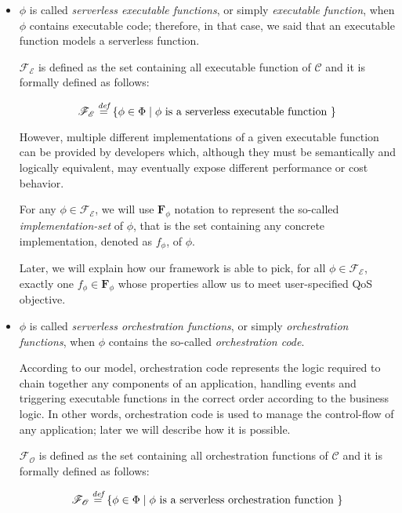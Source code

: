 \begin{itemize}
	
	\item $\phi$ is called \textit{serverless executable functions}, or simply \textit{executable function}, when $\phi$ contains executable code; therefore, in that case, we said that an executable function models a serverless function.
	
	$\mathscr{F_E}$ is defined as the set containing all executable function of $\mathcal{C}$ and it is formally defined as follows:
	
	\begin{equation}
		\mathscr{F_E} \overset{\textit{def}}{=} \left\lbrace \phi \in \Phi \mid \phi \text{ is a serverless executable function }\right\rbrace 
	\end{equation}
	
	However, multiple different implementations of a given executable function can be provided by developers which, although they must be semantically and logically equivalent, may eventually expose different performance or cost behavior. 
	
	For any $\phi \in \mathscr{F_E}$, we will use $\textbf{F}_{\phi}$ notation to represent the so-called \textit{implementation-set} of $\phi$, that is the set containing any concrete implementation, denoted as $f_{\phi}$, of $\phi$.
	
	Later, we will explain how our framework is able to pick, for all $\phi \in \mathscr{F_E}$, exactly one $f_{\phi} \in \textbf{F}_{\phi}$ whose properties allow us to meet user-specified QoS objective.
	
	\item $\phi$ is called \textit{serverless orchestration functions}, or simply \textit{orchestration functions}, when $\phi$ contains the so-called \textit{orchestration code}. 
	
	According to our model, orchestration code represents the logic required to chain together any components of an application, handling events and triggering executable functions in the correct order according to the business logic. In other words, orchestration code is used to manage the control-flow of any application; later we will describe how it is possible.
	
	$\mathscr{F_O}$ is defined as the set containing all orchestration functions of $\mathcal{C}$ and it is formally defined as follows:
	
	\begin{equation}
		\mathscr{F_O} \overset{\textit{def}}{=} \left\lbrace \phi \in \Phi \mid \phi \text{ is a serverless orchestration function }\right\rbrace 
	\end{equation}

\end{itemize}

